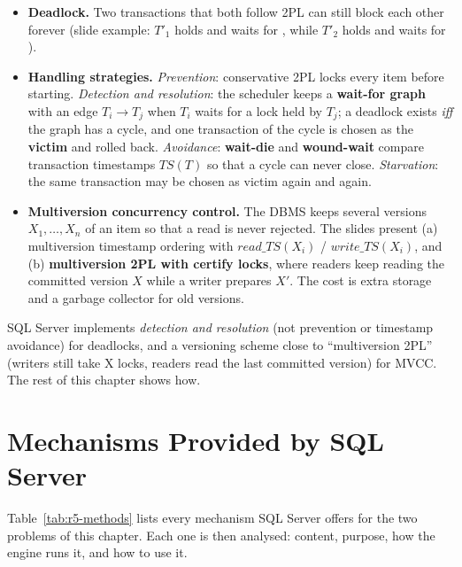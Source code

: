\begin{itemize}
  \item \textbf{Deadlock.} Two transactions that both follow 2PL can still block each other forever (slide example: $T'_1$ holds  and waits for , while $T'_2$ holds  and waits for ).
  \item \textbf{Handling strategies.} \emph{Prevention}: conservative 2PL locks every item before starting. \emph{Detection and resolution}: the scheduler keeps a \textbf{wait-for graph} with an edge $T_i \rightarrow T_j$ when $T_i$ waits for a lock held by $T_j$; a deadlock exists \emph{iff} the graph has a cycle, and one transaction of the cycle is chosen as the \textbf{victim} and rolled back. \emph{Avoidance}: \textbf{wait-die} and \textbf{wound-wait} compare transaction timestamps $TS(T)$ so that a cycle can never close. \emph{Starvation}: the same transaction may be chosen as victim again and again.
  \item \textbf{Multiversion concurrency control.} The DBMS keeps several versions $X_1,\dots,X_n$ of an item so that a read is never rejected. The slides present (a) multiversion timestamp ordering with $read\_TS(X_i)$ / $write\_TS(X_i)$, and (b) \textbf{multiversion 2PL with certify locks}, where readers keep reading the committed version $X$ while a writer prepares $X'$. The cost is extra storage and a garbage collector for old versions.
\end{itemize}

SQL Server implements \emph{detection and resolution} (not prevention or timestamp avoidance) for deadlocks, and a versioning scheme close to ``multiversion 2PL'' (writers still take X locks, readers read the last committed version) for MVCC. The rest of this chapter shows how.

\section{Mechanisms Provided by SQL Server}
\label{sec:r5-2-methods}

Table~\ref{tab:r5-methods} lists every mechanism SQL Server offers for the two problems of this chapter. Each one is then analysed: content, purpose, how the engine runs it, and how to use it.

